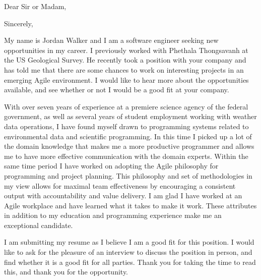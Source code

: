 \documentclass[11pt,letterpaper,sans]{moderncv}        %
\begin{document}
\date{December 28, 2018}
\opening{Dear Sir or Madam,}
\closing{Sincerely,}
\makelettertitle

My name is Jordan Walker and I am a software engineer seeking new opportunities in my career.  I previously worked with Phethala Thongsavanh at the US Geological Survey.  He recently took a position with your company and has told me that there are some chances to work on interesting projects in an emerging Agile environment.  I would like to hear more about the opportunities available, and see whether or not I would be a good fit at your company.

With over seven years of experience at a premiere science agency of the federal government, as well as several years of student employment working with weather data operations, I have found myself drawn to programming systems related to environmental data and scientific programming.  In this time I picked up a lot of the domain knowledge that makes me a more productive programmer and allows me to have more effective communication with the domain experts.  Within the same time period I have worked on adopting the Agile philosophy for programming and project planning.  This philosophy and set of methodologies in my view allows for maximal team effectiveness by encouraging a consistent output with accountability and value delivery.  I am glad I have worked at an Agile workplace and have learned what it takes to make it work.  These attributes in addition to my education and programming experience make me an exceptional candidate.

I am submitting my resume as I believe I am a good fit for this position.  I would like to ask for the pleasure of an interview to discuss the position in person, and find whether it is a good fit for all parties.  Thank you for taking the time to read this, and thank you for the opportunity.

\makeletterclosing
\end{document}
